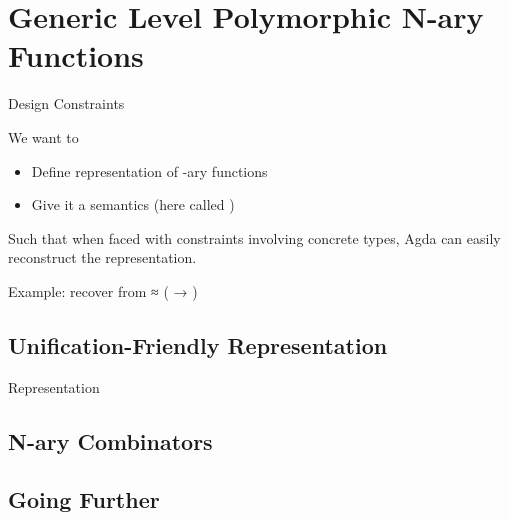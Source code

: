 \documentclass[compress,9pt]{beamer}
\begin{document}
\section{Generic Level Polymorphic N-ary Functions}

\begin{frame}{Design Constraints}

  We want to
  \begin{itemize}
    \item Define representation of -ary functions
    \item Give it a semantics (here called )
  \end{itemize}

  \bigskip
  Such that when faced with constraints involving concrete types,
  Agda can easily reconstruct the representation.

  \bigskip
  Example: recover  from {   ≈ ( → )}
\end{frame}

\subsection{Unification-Friendly Representation}

\begin{frame}{Representation}
  \begin{minipage}{0.5\textwidth}
  \end{minipage}\begin{minipage}{0.4\textwidth}
  \end{minipage}
\end{frame}

\subsection{N-ary Combinators}

\subsection{Going Further}


\begin{frame}
\end{frame}
\end{document}
